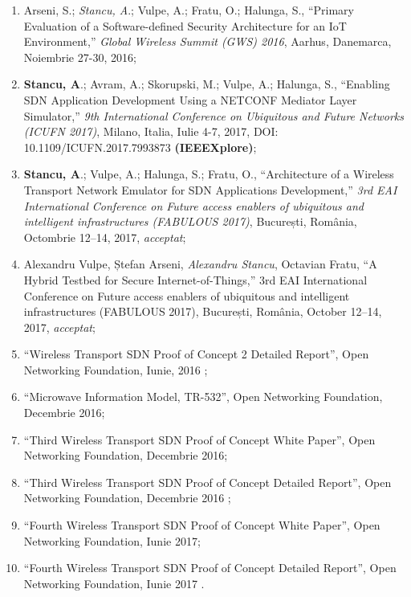 \begin{enumerate}
	\item Arseni, S.; \textit{Stancu, A}.; Vulpe, A.; Fratu, O.; Halunga, S., ``Primary Evaluation of a Software-defined Security Architecture for an IoT Environment,'' \textit{Global Wireless Summit (GWS) 2016}, Aarhus, Danemarca, Noiembrie 27-30, 2016;
	
	\item \textbf{Stancu, A}.; Avram, A.; Skorupski, M.; Vulpe, A.; Halunga, S., ``Enabling SDN Application Development Using a NETCONF Mediator Layer Simulator,'' \textit{9th International Conference on Ubiquitous and Future Networks (ICUFN 2017)}, Milano, Italia, Iulie 4-7, 2017, DOI: 10.1109/ICUFN.2017.7993873 \textbf{(IEEEXplore)}\label{item:dvm_v02};
	
	\item \textbf{Stancu, A}.; Vulpe, A.; Halunga, S.; Fratu, O., ``Architecture of a Wireless Transport Network Emulator for SDN Applications Development,'' \textit{3rd EAI International Conference on Future access enablers of ubiquitous and intelligent infrastructures (FABULOUS 2017)}, București, România, Octombrie 12–14, 2017, \textit{acceptat}\label{item:wte};
	
	\item Alexandru Vulpe, Ștefan Arseni, \textit{Alexandru Stancu}, Octavian Fratu, ``A Hybrid Testbed for Secure Internet-of-Things,'' 3rd EAI International Conference on Future access enablers of ubiquitous and intelligent infrastructures (FABULOUS 2017), București, România, October 12–14, 2017, \textit{acceptat};
	
	\item ``Wireless Transport SDN Proof of Concept 2 Detailed Report'', Open Networking Foundation, Iunie, 2016 \label{item:poc_2};
	
	\item ``Microwave Information Model, TR-532'', Open Networking Foundation, Decembrie 2016;
	
	\item ``Third Wireless Transport SDN Proof of Concept White Paper'', Open Networking Foundation, Decembrie 2016;
	
	\item ``Third Wireless Transport SDN Proof of Concept Detailed Report'', Open Networking Foundation, Decembrie 2016 \label{item:poc_3};
	
	\item ``Fourth Wireless Transport SDN Proof of Concept White Paper'', Open Networking Foundation, Iunie 2017;
	
	\item ``Fourth Wireless Transport SDN Proof of Concept Detailed Report'', Open Networking Foundation, Iunie 2017 \label{item:poc_4}.
	
\end{enumerate}